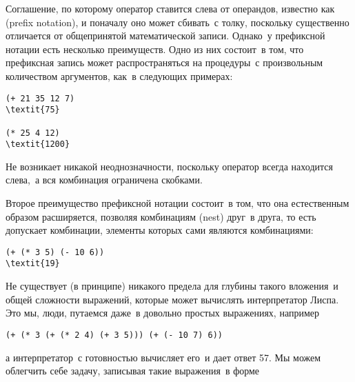 Соглашение, по которому оператор ставится слева от 
операндов, известно как  (prefix notation), и
поначалу оно может сбивать~с толку, поскольку существенно
отличается от общепринятой математической записи.  Однако~у префиксной нотации есть несколько преимуществ.  Одно из них состоит~в том, что 
префиксная запись может распространяться на процедуры~с 
произвольным количеством аргументов, как~в следующих
примерах:

\begin{Verbatim}[fontsize=\small]
(+ 21 35 12 7)
\textit{75}

(* 25 4 12)
\textit{1200}
\end{Verbatim}
Не возникает никакой неоднозначности, поскольку оператор 
всегда находится слева,~а вся комбинация ограничена скобками.

Второе преимущество префиксной нотации состоит~в том,
что она естественным образом расширяется, позволяя комбинациям
 (nest) друг~в друга, то есть
допускает
комбинации, элементы которых сами являются комбинациями:

\begin{Verbatim}[fontsize=\small]
(+ (* 3 5) (- 10 6))
\textit{19}
\end{Verbatim}

Не существует (в принципе) никакого предела для глубины
такого вложения~и общей сложности выражений, которые может вычислять
интерпретатор Лиспа.  Это мы, люди, путаемся даже~в довольно простых
выражениях, например

\begin{Verbatim}[fontsize=\small]
(+ (* 3 (+ (* 2 4) (+ 3 5))) (+ (- 10 7) 6))
\end{Verbatim}
а интерпретатор~с готовностью вычисляет его~и дает ответ 57.  Мы
можем облегчить себе задачу, записывая такие выражения~в форме

